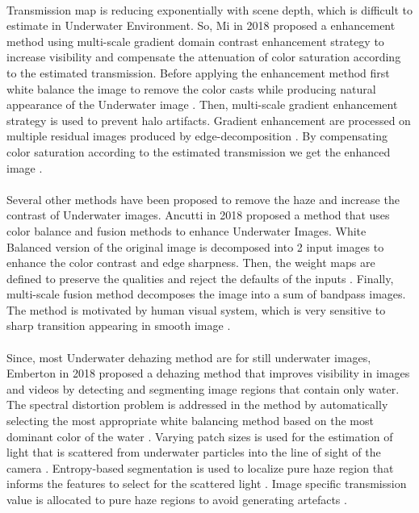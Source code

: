 \documentclass[a4paper,11pt,oneside]{article}
\begin{document}
  \\
  Transmission map is reducing exponentially with scene depth, which is difficult to estimate in Underwater Environment. So, Mi in 2018 \cite{11} proposed a enhancement method using multi-scale gradient domain contrast enhancement strategy to increase visibility and compensate the attenuation of color saturation according to the estimated transmission. Before applying the enhancement method first white balance the image to remove the color casts while producing natural appearance of the Underwater image \cite{11}. Then, multi-scale gradient enhancement strategy is used to prevent halo artifacts. Gradient enhancement are processed on multiple residual images produced by edge-decomposition \cite{11}. By compensating color saturation according to the estimated transmission we get the enhanced image \cite{11}.\\   
  \\
  Several other methods have been proposed to remove the haze and increase the contrast of Underwater images. Ancutti in 2018 \cite{16} proposed a method that uses color balance and fusion methods to enhance Underwater Images. White Balanced version of the original image is decomposed into 2 input images to enhance the color contrast and edge sharpness. Then, the weight maps are defined to preserve the qualities and reject the defaults of the inputs \cite{16}. Finally, multi-scale fusion method decomposes the image into a sum of bandpass images. The method is motivated by human visual system, which is very sensitive to sharp transition appearing in smooth image \cite{16}.\\
  \\
  Since, most Underwater dehazing method are for still underwater images, Emberton \cite{2} in 2018 proposed a dehazing method that improves visibility in images and videos by detecting and segmenting image regions that contain only water. The spectral distortion problem is addressed in the method by automatically selecting the most appropriate white balancing method based on the most dominant color of the water \cite{2}. Varying patch sizes is used for the estimation of light that is scattered from underwater particles into the line of sight of the camera \cite{2}. Entropy-based segmentation is used to localize pure haze region that informs the features to select for the scattered light \cite{2}. Image specific transmission value is allocated to pure haze regions to avoid generating artefacts \cite{2}.\\
  \\
\end{document}
